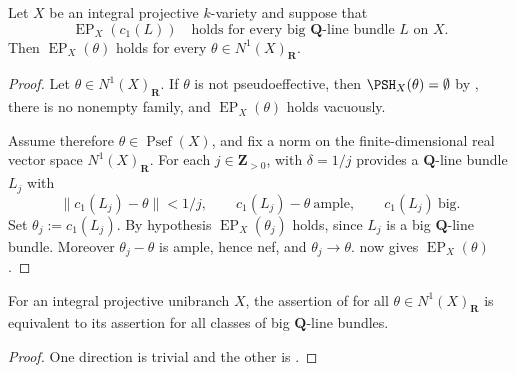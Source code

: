 \begin{proposition}
\label{prop:ch45-reduction-big-rational}
Let $X$ be an integral projective $k$-variety and suppose that
\[
 \operatorname{EP}_X(c_1(L))\quad\text{holds for every big }
 \mathbf Q\text{-line bundle }L\text{ on }X .
\]
Then $\operatorname{EP}_X(\theta)$ holds for every
$\theta\in N^1(X)_{\mathbf R}$.
\end{proposition}

\begin{proof}
Let $\theta\in N^1(X)_{\mathbf R}$.  If $\theta$ is not
pseudoeffective, then $\PSH_X(\theta)=\emptyset$ by
, there is no nonempty family, and
$\operatorname{EP}_X(\theta)$ holds vacuously.

Assume therefore $\theta\in\operatorname{Psef}(X)$, and fix a norm on the
finite-dimensional real vector space $N^1(X)_{\mathbf R}$.  For each
$j\in\mathbf Z_{>0}$,  with
$\delta=1/j$ provides a $\mathbf Q$-line bundle $L_j$ with
\[
 \lVert c_1(L_j)-\theta\rVert<1/j,
 \qquad
 c_1(L_j)-\theta\ \text{ample},
 \qquad
 c_1(L_j)\ \text{big}.
\]
Set $\theta_j:=c_1(L_j)$.  By hypothesis $\operatorname{EP}_X(\theta_j)$
holds, since $L_j$ is a big $\mathbf Q$-line bundle.  Moreover
$\theta_j-\theta$ is ample, hence nef, and $\theta_j\to\theta$.
 now gives $\operatorname{EP}_X(\theta)$.
\end{proof}

\begin{corollary}
\label{cor:ch45-big-rational-suffices}
For an integral projective unibranch $X$, the assertion of
 for all $\theta\in N^1(X)_{\mathbf R}$ is
equivalent to its assertion for all classes of big $\mathbf Q$-line
bundles.
\end{corollary}

\begin{proof}
One direction is trivial and the other is
.
\end{proof}

